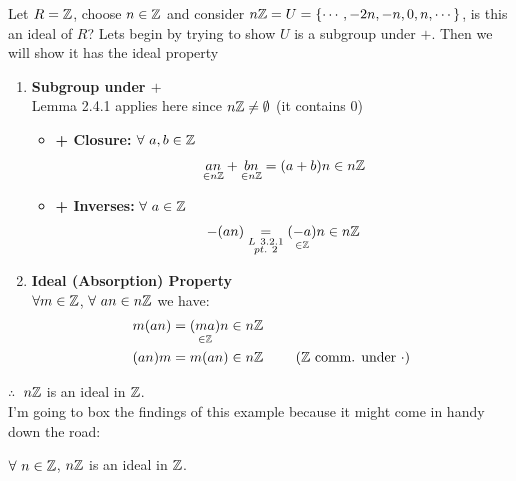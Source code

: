 \begin{example}
    Let $R={\mathbb{Z}}$, choose $n \in {\mathbb{Z}}$ and consider $n{\mathbb{Z}} = U = \{\cdots, -2n, -n, 0,n, \cdots\}$, is this
    an ideal of $R$? Lets begin by trying to show $U$ is a subgroup under $+$. Then we will show it
    has the ideal property
    \begin{enumerate}[label=\roman*)]
        \item \textbf{Subgroup under $+$} \\ Lemma 2.4.1 applies here since $n{\mathbb{Z}} \neq \emptyset$ (it
        contains 0)
        \begin{itemize}
            \item \textbf{+ Closure:} $\forall \ a,b\in \Z$
            \begin{align}
                \underset{\in n{\mathbb{Z}}}{an}+\underset{\in n{\mathbb{Z}}}{bn} = (a+b)n \in n{\mathbb{Z}} \nonumber
            \end{align}
            \item \textbf{+ Inverses:} $\forall \ a\in \Z$
            \begin{align}
                -(an) \underset{\substack{L\ 3.2.1\\pt.\ 2}}{=} \underset{\in {\mathbb{Z}} }{(-a)}n \in n {\mathbb{Z}} \nonumber
            \end{align}
        \end{itemize}
        \item \textbf{Ideal (Absorption) Property} \\ $\forall m \in {\mathbb{Z}}$, $\forall \ an \in n{\mathbb{Z}}$ we
        have:
        \begin{align}
            m(an)&=\underset{\in {\mathbb{Z}}}{(ma)}n \in n {\mathbb{Z}} \nonumber \\
            (an)m&=m(an) \in n {\mathbb{Z}} \ \ \ \ \ \ \ ({\mathbb{Z}} \text{ comm. under }\cdot)\nonumber
        \end{align}
    \end{enumerate}

    $\therefore \ $  $n{\mathbb{Z}}$ is an ideal in ${\mathbb{Z}}$.\\
     I'm going to box the findings of this example because it might come in handy down the road:
     \begin{tcolorbox}[width=2in, center=true]
\begin{center}
    $\forall \ n \in {\mathbb{Z}}$, $n{\mathbb{Z}}$ is an ideal in ${\mathbb{Z}}$.
\end{center}
\end{tcolorbox}
\end{example}

